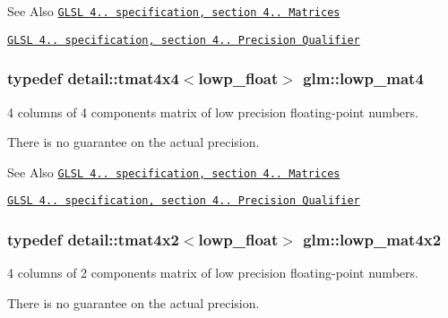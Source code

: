 \begin{DoxySeeAlso}{See Also}
\href{http://www.opengl.org/registry/doc/GLSLangSpec.4.20.8.pdf}{\tt G\-L\-S\-L 4.. specification, section 4.. Matrices} 

\href{http://www.opengl.org/registry/doc/GLSLangSpec.4.20.8.pdf}{\tt G\-L\-S\-L 4.. specification, section 4.. Precision Qualifier} 
\end{DoxySeeAlso}
\hypertarget{group__core__precision_ga39e75439a03361f4407feab2e2eb5f93}{
\subsubsection[{lowp\-\_\-mat4}]{\setlength{\rightskip}{0pt plus 5cm}typedef detail\-::tmat4x4$<$lowp\-\_\-float$>$ {\bf glm\-::lowp\-\_\-mat4}}}\label{group__core__precision_ga39e75439a03361f4407feab2e2eb5f93}


4 columns of 4 components matrix of low precision floating-\/point numbers. 

There is no guarantee on the actual precision.

\begin{DoxySeeAlso}{See Also}
\href{http://www.opengl.org/registry/doc/GLSLangSpec.4.20.8.pdf}{\tt G\-L\-S\-L 4.. specification, section 4.. Matrices} 

\href{http://www.opengl.org/registry/doc/GLSLangSpec.4.20.8.pdf}{\tt G\-L\-S\-L 4.. specification, section 4.. Precision Qualifier} 
\end{DoxySeeAlso}
\hypertarget{group__core__precision_gaf8f0828066f6c6fbd2c815832743e401}{
\subsubsection[{lowp\-\_\-mat4x2}]{\setlength{\rightskip}{0pt plus 5cm}typedef detail\-::tmat4x2$<$lowp\-\_\-float$>$ {\bf glm\-::lowp\-\_\-mat4x2}}}\label{group__core__precision_gaf8f0828066f6c6fbd2c815832743e401}


4 columns of 2 components matrix of low precision floating-\/point numbers. 

There is no guarantee on the actual precision.

